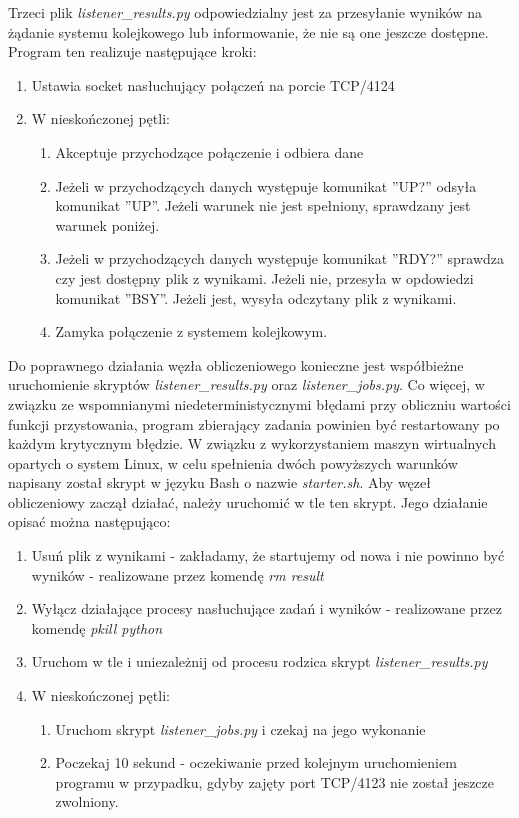 Trzeci plik \textit{listener\_results.py} odpowiedzialny jest za przesyłanie wyników na żądanie systemu kolejkowego lub informowanie, że nie są one jeszcze dostępne.
Program ten realizuje następujące kroki:
\begin{enumerate}
  \item Ustawia socket nasłuchujący połączeń na porcie TCP/4124
  \item W nieskończonej pętli:
  \begin{enumerate}
    \item Akceptuje przychodzące połączenie i odbiera dane
    \item Jeżeli w przychodzących danych występuje komunikat ''UP?'' odsyła komunikat ''UP''. Jeżeli warunek nie jest spełniony, sprawdzany jest warunek poniżej.
    \item Jeżeli w przychodzących danych występuje komunikat ''RDY?'' sprawdza czy jest dostępny plik z wynikami. Jeżeli nie, przesyła w opdowiedzi komunikat ''BSY''. Jeżeli jest, wysyła odczytany plik z wynikami.
    \item Zamyka połączenie z systemem kolejkowym.
  \end{enumerate}
\end{enumerate}

Do poprawnego działania węzła obliczeniowego konieczne jest współbieżne uruchomienie skryptów \textit{listener\_results.py} oraz \textit{listener\_jobs.py}.
Co więcej, w związku ze wspomnianymi niedeterministycznymi błędami przy obliczniu wartości funkcji przystowania, program zbierający zadania powinien być restartowany po każdym krytycznym błędzie.
W związku z wykorzystaniem maszyn wirtualnych opartych o system Linux, w celu spełnienia dwóch powyższych warunków napisany został skrypt w języku Bash o nazwie \textit{starter.sh}.
Aby węzeł obliczeniowy zaczął działać, należy uruchomić w tle ten skrypt.
Jego działanie opisać można następująco:
\begin{enumerate}
  \item Usuń plik z wynikami - zakładamy, że startujemy od nowa i nie powinno być wyników - realizowane przez komendę \textit{rm result}
  \item Wyłącz działające procesy nasłuchujące zadań i wyników - realizowane przez komendę \textit{pkill python}
  \item Uruchom w tle i uniezależnij od procesu rodzica skrypt \textit{listener\_results.py}
  \item W nieskończonej pętli:
  \begin{enumerate}
    \item Uruchom skrypt \textit{listener\_jobs.py} i czekaj na jego wykonanie
    \item Poczekaj 10 sekund - oczekiwanie przed kolejnym uruchomieniem programu w przypadku, gdyby zajęty port TCP/4123 nie został jeszcze zwolniony.
  \end{enumerate}
\end{enumerate}


